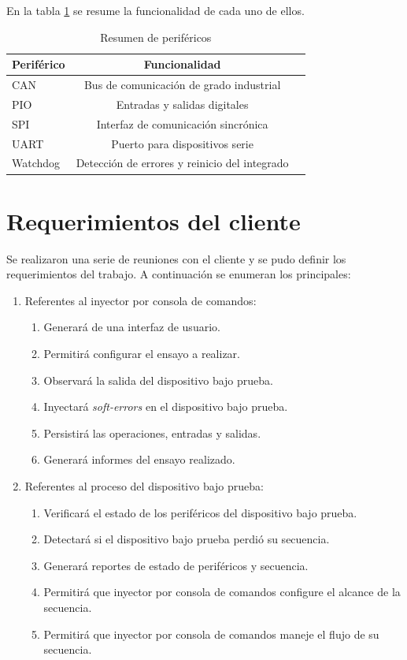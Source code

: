 En la tabla \ref{tab:perifericosresumen} se resume la funcionalidad de cada uno de ellos.

\begin{table}[h]
	\centering
	\caption[Resumen de periféricos]{Resumen de periféricos}
	\begin{tabular}{l c c}    
		\toprule
        \textbf{Periférico} & \textbf{Funcionalidad}\\
		\midrule
		CAN                 & Bus de comunicación de grado industrial\\        	
		PIO                 & Entradas y salidas digitales\\
		SPI                 & Interfaz de comunicación sincrónica\\
		UART                & Puerto para dispositivos serie\\
		Watchdog            & Detección de errores y reinicio del integrado\\
		\bottomrule
		\hline
	\end{tabular}
	\label{tab:perifericosresumen}
\end{table}

\section{Requerimientos del cliente}
\label{sec:emphuerimientos}

Se realizaron una serie de reuniones con el cliente y se pudo definir los requerimientos del trabajo.
A continuación se enumeran los principales:

\begin{enumerate}
	\item Referentes al inyector por consola de comandos:
		\begin{enumerate}
			\item Generará de una interfaz de usuario.
			\item Permitirá configurar el ensayo a realizar.
			\item Observará la salida del dispositivo bajo prueba.
            \item Inyectará \emph{soft-errors} en el dispositivo bajo prueba.
			\item Persistirá las operaciones, entradas y salidas.
			\item Generará informes del ensayo realizado.
		\end{enumerate}
	\item Referentes al proceso del dispositivo bajo prueba:
		\begin{enumerate}
			\item Verificará el estado de los periféricos del dispositivo bajo prueba.
			\item Detectará si el dispositivo bajo prueba perdió su secuencia.
			\item Generará reportes de estado de periféricos y secuencia.
			\item Permitirá que inyector por consola de comandos configure el alcance de la secuencia.
			\item Permitirá que inyector por consola de comandos maneje el flujo de su secuencia.
		\end{enumerate}
\end{enumerate}

